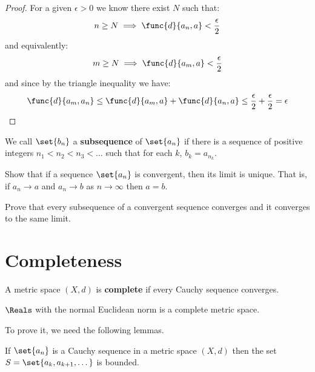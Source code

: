 \begin{proof}
    For a given \(\epsilon > 0 \) we know there exist \(N\) such that:
    \begin{equation*}  
        n \geq N \implies \func{d}{a_n,a} < \frac{\epsilon}{2} 
    \end{equation*}
    and equivalently:
    \begin{equation*}  
        m \geq N \implies \func{d}{a_m,a} < \frac{\epsilon}{2} 
    \end{equation*}
    and since by the triangle inequality we have:
    \begin{equation*}
        \func{d}{a_m,a_n} \leq  \func{d}{a_m,a} +  \func{d}{a_n,a} \leq \frac{\epsilon}{2} + \frac{\epsilon}{2} = \epsilon
    \end{equation*}
\end{proof}

\begin{definition} [Subsequence]
    We call \(\set{ b_n }\) a \textbf{subsequence} of \(\set{ a_n }\) if there is a sequence of positive integers \(n_1 < n_2 < n_3 < \dots \) such that for each \(k\), \(b_k = a_{n_k}\).
\end{definition}

\begin{exercise}
    \item Show that if a sequence \(\set{a_n }\) is convergent, then its limit is unique. That is, if \(a_n \to a \) and \(a_n \to b\) as \(n \to \infty\) then \(a = b\).
    \item Prove that every subsequence of a convergent sequence converges and it converges to the same limit.
\end{exercise}
\newpage

\section{Completeness}
A metric space \((X,d)\) is \textbf{complete} if every Cauchy sequence converges.

\begin{proposition}
    \(\Reals\) with the normal Euclidean norm is a complete metric space.
\end{proposition}

To prove it, we need the following lemmas.

\begin{lemma} \label{Bounded}
    If \(\set{ a_n }\) is a Cauchy sequence in a metric space \((X,d)\) then the set \(S = \set{ a_k , a_{k + 1}, \dots }\) is bounded.
\end{lemma}

